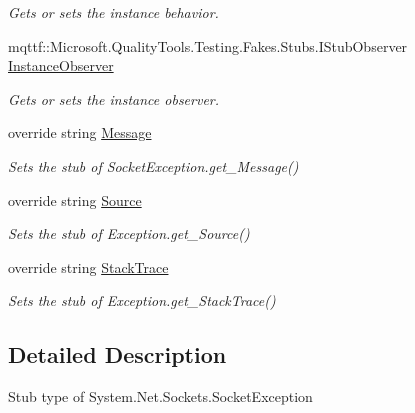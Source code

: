 \begin{DoxyCompactItemize}
\begin{DoxyCompactList}\small\item\em Gets or sets the instance behavior.\end{DoxyCompactList}\item 
mqttf\-::\-Microsoft.\-Quality\-Tools.\-Testing.\-Fakes.\-Stubs.\-I\-Stub\-Observer \hyperlink{class_system_1_1_net_1_1_sockets_1_1_fakes_1_1_stub_socket_exception_a4f04dc4cda39756100c998395e684dd0}{Instance\-Observer}
\begin{DoxyCompactList}\small\item\em Gets or sets the instance observer.\end{DoxyCompactList}\item 
override string \hyperlink{class_system_1_1_net_1_1_sockets_1_1_fakes_1_1_stub_socket_exception_a7b124a48085d81b84cc70f9770da61d6}{Message}
\begin{DoxyCompactList}\small\item\em Sets the stub of Socket\-Exception.\-get\-\_\-\-Message()\end{DoxyCompactList}\item 
override string \hyperlink{class_system_1_1_net_1_1_sockets_1_1_fakes_1_1_stub_socket_exception_aed6188fac6e26d9b603c20651af60c75}{Source}
\begin{DoxyCompactList}\small\item\em Sets the stub of Exception.\-get\-\_\-\-Source()\end{DoxyCompactList}\item 
override string \hyperlink{class_system_1_1_net_1_1_sockets_1_1_fakes_1_1_stub_socket_exception_aa1469129d5687517e593d0c962a5c6d2}{Stack\-Trace}
\begin{DoxyCompactList}\small\item\em Sets the stub of Exception.\-get\-\_\-\-Stack\-Trace()\end{DoxyCompactList}\end{DoxyCompactItemize}


\subsection{Detailed Description}
Stub type of System.\-Net.\-Sockets.\-Socket\-Exception



